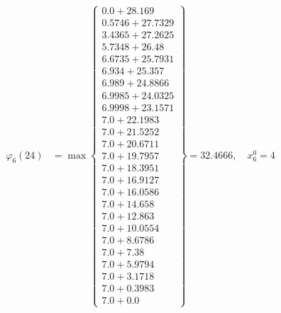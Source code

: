 \documentclass{article}
\begin{document}
\begin{align*}
\varphi_{6}(24) &= \max \left\{ \begin{array}{c}
0.0 + 28.169 \\
 0.5746 + 27.7329 \\
 3.4365 + 27.2625 \\
 5.7348 + 26.48 \\
 6.6735 + 25.7931 \\
 6.934 + 25.357 \\
 6.989 + 24.8866 \\
 6.9985 + 24.0325 \\
 6.9998 + 23.1571 \\
 7.0 + 22.1983 \\
 7.0 + 21.5252 \\
 7.0 + 20.6711 \\
 7.0 + 19.7957 \\
 7.0 + 18.3951 \\
 7.0 + 16.9127 \\
 7.0 + 16.0586 \\
 7.0 + 14.658 \\
 7.0 + 12.863 \\
 7.0 + 10.0554 \\
 7.0 + 8.6786 \\
 7.0 + 7.38 \\
 7.0 + 5.9794 \\
 7.0 + 3.1718 \\
 7.0 + 0.3983 \\
 7.0 + 0.0
\end{array} \right\}=32.4666, \quad x_{6}^0=4\\
  

\end{align*}
\end{document}

